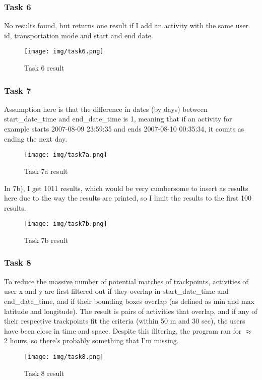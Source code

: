 \documentclass[12pt, titlepage]{report}
\begin{document}
\subsubsection*{Task 6}
No results found, but returns one result if I add an activity with the same user id, transportation mode and start and end date.
\begin{figure}[H]
    \centering
    \texttt{[image: img/task6.png]}
    \caption{Task 6 result}
    \label{fig:my_label}
\end{figure}
\subsubsection*{Task 7}
Assumption here is that the difference in dates (by days) between start\_date\_time and end\_date\_time is 1, meaning that if an activity for example starts 2007-08-09 23:59:35 and ends 2007-08-10 00:35:34, it counts as ending the next day. 
\begin{figure}[H]
    \centering
    \texttt{[image: img/task7a.png]}
    \caption{Task 7a result}
    \label{fig:my_label}
\end{figure}
In 7b), I get 1011 results, which would be very cumbersome to insert as results here due to the way the results are printed, so I limit the results to the first 100 results.
\begin{figure}[H]
    \centering
    \texttt{[image: img/task7b.png]}
    \caption{Task 7b result}
    \label{fig:my_label}
\end{figure}
\subsubsection*{Task 8}
To reduce the massive number of potential matches of trackpoints, activities of user x and y are first filtered out if they overlap in start\_date\_time and end\_date\_time, and if their bounding boxes overlap (as defined as min and max latitude and longitude). The result is pairs of activities that overlap, and if any of their respective trackpoints fit the criteria (within 50 m and 30 sec), the users have been close in time and space. Despite this filtering, the program ran for $\approx$ 2 hours, so there's probably something that I'm missing.
\begin{figure}[H]
    \centering
    \texttt{[image: img/task8.png]}
    \caption{Task 8 result}
    \label{fig:my_label}
\end{figure}
\end{document}
